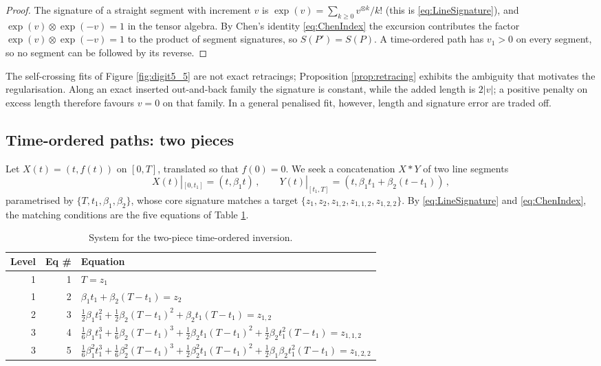 \documentclass[11pt,english]{article}
\providecommand{\tabularnewline}{\\}
\theoremstyle{definition}
\theoremstyle{remark}
\begin{document}
\begin{proof}
The signature of a straight segment with increment $v$ is
$\exp(v)=\sum_{k\geq0}v^{\otimes k}/k!$ (this is \eqref{eq:LineSignature}),
and $\exp(v)\otimes\exp(-v)=1$ in the tensor algebra. By Chen's identity
\eqref{eq:ChenIndex} the excursion contributes the factor
$\exp(v)\otimes\exp(-v)=1$ to the product of segment signatures, so
$S(P')=S(P)$. A time-ordered path has $v_{1}>0$ on every segment, so no
segment can be followed by its reverse.
\end{proof}


The self-crossing fits of Figure \ref{fig:digit5_5} are not exact
retracings; Proposition \ref{prop:retracing} exhibits the ambiguity
that motivates the regularisation. Along an exact inserted out-and-back
family the signature is constant, while the added length is $2|v|$;
a positive penalty on excess length therefore favours $v=0$ on that
family. In a general penalised fit, however, length and signature
error are traded off.

\subsection{Time-ordered paths: two pieces}

Let $X(t)=(t,f(t))$ on $[0,T]$, translated so that $f(0)=0$. We seek a concatenation $X*Y$ of
two line segments
\[
X(t)|_{[0,t_{1}]}=(t,\beta_{1}t)\,,\qquad Y(t)|_{[t_{1},T]}=(t,\beta_{1}t_{1}+\beta_{2}(t-t_{1}))\,,
\]
parametrised by $\{T,t_{1},\beta_{1},\beta_{2}\}$, whose core signature
matches a target $\{z_{1},z_{2},z_{1,2},z_{1,1,2},z_{1,2,2}\}$. By
\eqref{eq:LineSignature} and \eqref{eq:ChenIndex}, the matching conditions
are the five equations of Table \ref{tab:SystemChenTS2P}.

\begin{table}[H]
\centering
\begin{tabular}{|r|r|l|}
\hline
Level & Eq \# & Equation\tabularnewline\hline\hline
1 & 1 & $T=z_{1}$\tabularnewline\hline
1 & 2 & $\beta_{1}t_{1}+\beta_{2}(T-t_{1})=z_{2}$\tabularnewline\hline
2 & 3 & $\frac{1}{2}\beta_{1}t_{1}^{2}+\frac{1}{2}\beta_{2}(T-t_{1})^{2}+\beta_{2}t_{1}(T-t_{1})=z_{1,2}$\tabularnewline\hline
3 & 4 & $\frac{1}{6}\beta_{1}t_{1}^{3}+\frac{1}{6}\beta_{2}(T-t_{1})^{3}+\frac{1}{2}\beta_{2}t_{1}(T-t_{1})^{2}+\frac{1}{2}\beta_{2}t_{1}^{2}(T-t_{1})=z_{1,1,2}$\tabularnewline\hline
3 & 5 & $\frac{1}{6}\beta_{1}^{2}t_{1}^{3}+\frac{1}{6}\beta_{2}^{2}(T-t_{1})^{3}+\frac{1}{2}\beta_{2}^{2}t_{1}(T-t_{1})^{2}+\frac{1}{2}\beta_{1}\beta_{2}t_{1}^{2}(T-t_{1})=z_{1,2,2}$\tabularnewline\hline
\end{tabular}
\caption{System for the two-piece time-ordered inversion.\label{tab:SystemChenTS2P}}
\end{table}
\end{document}
